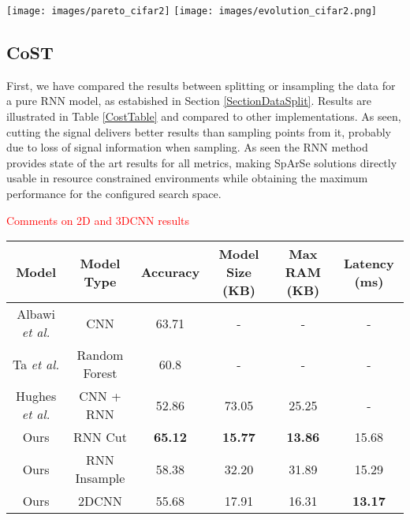 \documentclass[10pt, a4paper, twocolumn]{article}
\begin{document}
\begin{figure*}[bp]
	\centering
	\texttt{[image: images/pareto\_cifar2]}
	\texttt{[image: images/evolution\_cifar2.png]}
	\caption{Left: Pareto frontier for our implementation of Sparse and Cifar 10 Binary. Notice the different possibilities to choose among regarding RAM, size and performance. Each point corresponds to a specific configuration of the search space. Right: full search procedure for CIFAR-10 Binary with the modified SpArSe. The color degradation shows the progress of the search.}
	\label{fig:paretocifar2}
\end{figure*}



\subsection{CoST}
First, we have compared the results between splitting or insampling the data for a pure RNN model, as estabished in Section \ref{SectionDataSplit}. Results are illustrated in Table \ref{CostTable} and compared to other implementations. As seen, cutting the signal delivers better results than sampling points from it, probably due to loss of signal information when sampling. As seen the RNN method provides state of the art results for all metrics, making SpArSe solutions directly usable in resource constrained environments while obtaining the maximum performance for the configured search space. 

\textcolor{red}{Comments on 2D and 3DCNN results}

\begin{table*}
\center
\begin{tabular}{|c|c|c|c|c|c|}
	\hline
	Model	& Model Type & Accuracy & Model Size (KB) & Max RAM (KB) & Latency (ms) \\
	\hline
	Albawi \textit{et al.} \cite{Albawi2018}  & CNN & 63.71  & -  & -  & - \\
	\hline
	Ta \textit{et al.} \cite{Ta2015a} & Random Forest & 60.8  & -  & - & -  \\
	\hline
	Hughes \textit{et al.} \cite{Hughes2017} & CNN + RNN & 52.86 &  73.05 & 25.25 & -  \\
	\hline
	Ours & RNN Cut & \textbf{65.12} & \textbf{15.77} & \textbf{13.86} & 15.68 \\
	\hline
	Ours & RNN Insample & 58.38 & 32.20 & 31.89 & 15.29 \\
	\hline
	Ours & 2DCNN & 55.68 & 17.91 & 16.31 & \textbf{13.17} \\
	\hline
	
\end{tabular}
\caption{Results for the CoST dataset with hold one subject out cross validation, as in \cite{Albawi2018} and \cite{Jung2015}.}\label{CostTable}
\end{table*}
\end{document}
